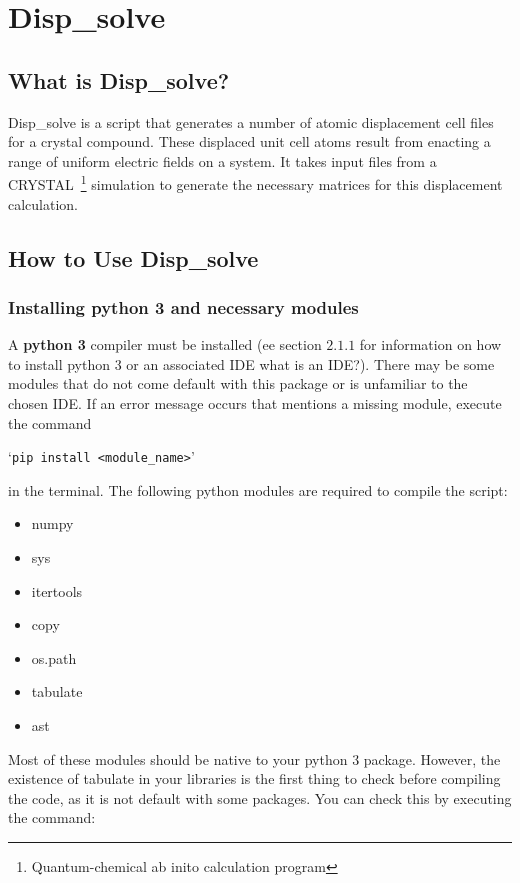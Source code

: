 \section{Disp\_solve}
\subsection{What is Disp\_solve?}
Disp\_solve is a script that generates a number of atomic displacement cell
files for a crystal compound. These displaced unit cell atoms result from
enacting a range of uniform electric fields on a system. It takes input files
from a CRYSTAL~\footnote{Quantum-chemical ab inito calculation program}
simulation to generate the necessary matrices for this displacement
calculation.

\subsection{How to Use Disp\_solve}
\subsubsection{Installing python 3 and necessary modules}
A \textbf{python 3} compiler must be installed (ee section $2.1.1$ for
information on how to install python 3 or an associated IDE {\color{red} what
  is an IDE?}). There may be some modules that do not come default with this
package or is unfamiliar to the chosen IDE. If an error message occurs that
mentions a missing module, execute the command

`\texttt{pip install <module\_name>}'

in the terminal. The following python modules are required to compile
the script:
  \begin{itemize} \itemsep -0.5ex
 	\item numpy
 	\item sys
 	\item itertools
 	\item copy
 	\item os.path
 	\item tabulate
 	\item ast
 \end{itemize}

Most of these modules should be native to your python 3 package. However, the existence of tabulate in your libraries is the first thing to check before compiling the code, as it is not default with some packages. You can check this by executing the command:

